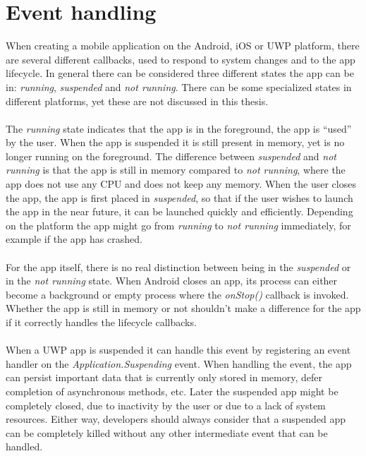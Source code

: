 \documentclass[pdftex,a4paper,12pt,twoside]{report}
\begin{document}
\section{Event handling}
When creating a mobile application on the Android, iOS or UWP platform, there are several different callbacks, used to respond to system changes and to the app lifecycle. In general there can be considered three different states the app can be in: \emph{running}, \emph{suspended} and \emph{not running}. There can be some specialized states in different platforms, yet these are not discussed in this thesis.
\\\\
The \emph{running} state indicates that the app is in the foreground, the app is ``used'' by the user. When the app is suspended it is still present in memory, yet is no longer running on the foreground. The difference between \emph{suspended} and \emph{not running} is that the app is still in memory compared to \emph{not running}, where the app does not use any CPU and does not keep any memory. When the user closes the app, the app is first placed in \emph{suspended}, so that if the user wishes to launch the app in the near future, it can be launched quickly and efficiently. Depending on the platform the app might go from \emph{running} to \emph{not running} immediately, for example if the app has crashed.
\\\\
For the app itself, there is no real distinction between being in the \emph{suspended} or in the \emph{not running} state. When Android closes an app, its process can either become a background or empty process where the \emph{onStop()} callback is invoked. Whether the app is still in memory or not shouldn't make a difference for the app if it correctly handles the lifecycle callbacks.
\\\\
When a UWP app is suspended it can handle this event by registering an event handler on the \emph{Application.Suspending} event. When handling the event, the app can persist important data that is currently only stored in memory, defer completion of asynchronous methods, etc. Later the suspended app might be completely closed, due to inactivity by the user or due to a lack of system resources. Either way, developers should always consider that a suspended app can be completely killed without any other intermediate event that can be handled.
\\\\
\end{document}

